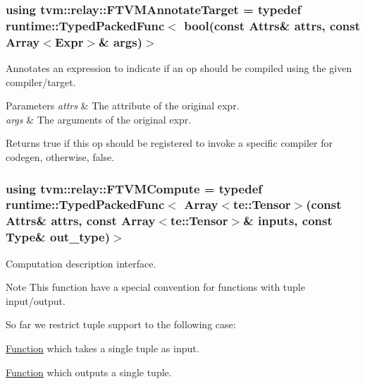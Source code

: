 \subsubsection[{\texorpdfstring{F\+T\+V\+M\+Annotate\+Target}{FTVMAnnotateTarget}}]{\setlength{\rightskip}{0pt plus 5cm}using {\bf tvm\+::relay\+::\+F\+T\+V\+M\+Annotate\+Target} = typedef {\bf runtime\+::\+Typed\+Packed\+Func}$<$ bool(const {\bf Attrs}\& attrs, const {\bf Array}$<${\bf Expr}$>$\& args)$>$}\hypertarget{namespacetvm_1_1relay_ab140f1857d8471d98fe5371f8da68154}{}\label{namespacetvm_1_1relay_ab140f1857d8471d98fe5371f8da68154}


Annotates an expression to indicate if an op should be compiled using the given compiler/target. 


\begin{DoxyParams}{Parameters}
{\em attrs} & The attribute of the original expr. \\
\hline
{\em args} & The arguments of the original expr.\\
\hline
\end{DoxyParams}
\begin{DoxyReturn}{Returns}
true if this op should be registered to invoke a specific compiler for codegen, otherwise, false. 
\end{DoxyReturn}
\subsubsection[{\texorpdfstring{F\+T\+V\+M\+Compute}{FTVMCompute}}]{\setlength{\rightskip}{0pt plus 5cm}using {\bf tvm\+::relay\+::\+F\+T\+V\+M\+Compute} = typedef {\bf runtime\+::\+Typed\+Packed\+Func}$<$ {\bf Array}$<${\bf te\+::\+Tensor}$>$(const {\bf Attrs}\& attrs, const {\bf Array}$<${\bf te\+::\+Tensor}$>$\& inputs, const {\bf Type}\& out\+\_\+type)$>$}\hypertarget{namespacetvm_1_1relay_a63a0893a8379998657ddff39a3162188}{}\label{namespacetvm_1_1relay_a63a0893a8379998657ddff39a3162188}


Computation description interface. 

\begin{DoxyNote}{Note}
This function have a special convention for functions with tuple input/output.
\end{DoxyNote}
So far we restrict tuple support to the following case\+:
\begin{DoxyItemize}
\item \hyperlink{classtvm_1_1relay_1_1Function}{Function} which takes a single tuple as input.
\item \hyperlink{classtvm_1_1relay_1_1Function}{Function} which outputs a single tuple.
\end{DoxyItemize}

